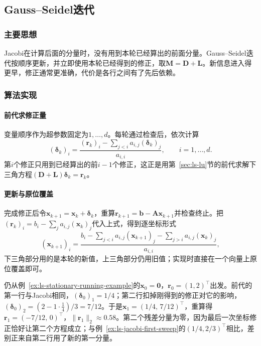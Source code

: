 \subsection{Gauss--Seidel迭代}
\label{sec:ls-gauss-seidel}

\subsubsection{主要思想}

Jacobi在计算后面的分量时，没有用到本轮已经算出的前面分量。Gauss--Seidel迭代按顺序更新，并立即使用本轮已经得到的修正，取$\bm M=\bm D+\bm L$。新信息进入得更早，修正通常更准确，代价是各行之间有了先后依赖。

\subsubsection{算法实现}

\paragraph{前代求修正量}
变量顺序作为超参数固定为$1,\ldots,d$。每轮通过检查后，依次计算
\[
(\bm\delta_k)_i=\frac{(\bm r_k)_i-\sum_{j<i}a_{i,j}(\bm\delta_k)_j}{a_{i,i}},\qquad i=1,\ldots,d .
\]
第$i$个修正只用到已经算出的前$i-1$个修正，这正是用第~\ref{sec:ls-lu}节的前代求解下三角方程$(\bm D+\bm L)\bm\delta_k=\bm r_k$。

\paragraph{更新与原位覆盖}
完成修正后令$\bm x_{k+1}=\bm x_k+\bm\delta_k$，重算$\bm r_{k+1}=\bm b-\bm A\bm x_{k+1}$并检查终止。把$(\bm r_k)_i=b_i-\sum_j a_{i,j}(\bm x_k)_j$代入上式，得到逐坐标形式
\[
(\bm x_{k+1})_i=\frac{b_i-\sum_{j<i}a_{i,j}(\bm x_{k+1})_j-\sum_{j>i}a_{i,j}(\bm x_k)_j}{a_{i,i}} ,
\]
下三角部分用的是本轮的新值，上三角部分仍用旧值；实现时直接在一个向量上原位覆盖即可。

\begin{example}
\label{ex:ls-gauss-seidel-first-sweep}
仍从例~\ref{ex:ls-stationary-running-example}的$\bm x_0=\bm 0$，$\bm r_0=(1,2)^\top$出发。前代的第一行与Jacobi相同，$(\bm\delta_0)_1=1/4$；第二行扣掉刚得到的修正对它的影响，$(\bm\delta_0)_2=(2-1\cdot\tfrac14)/3=7/12$。于是$\bm x_1=(1/4,\,7/12)^\top$，重算得$\bm r_1=(-7/12,\,0)^\top$，$\lVert\bm r_1\rVert_2\approx0.58$。第二个残差分量为零，因为最后一次坐标修正恰好让第二个方程成立；与例~\ref{ex:ls-jacobi-first-sweep}的$(1/4,2/3)^\top$相比，差别正来自第二行用了新的第一分量。
\end{example}

